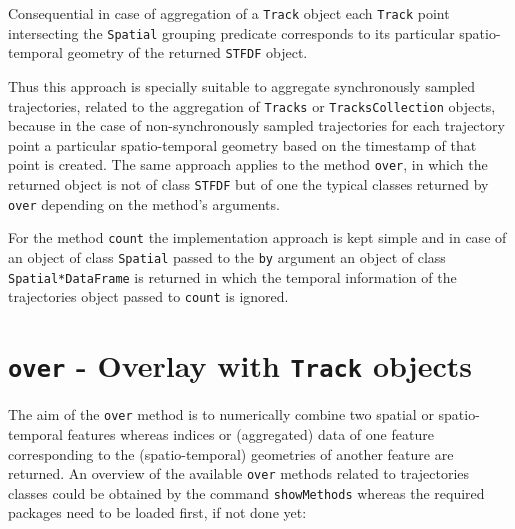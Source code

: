 \documentclass[12pt, oneside, a4paper]{scrbook}
\newcommand{\pkg}[1]{{\normalfont\fontseries{b}\selectfont #1}}
\let\code=\texttt
\newcommand{\codeintitles}[1]{{\tt #1}} %
\begin{document}
Consequential in case of aggregation of a \code{Track} object each \code{Track} point intersecting the \code{Spatial} grouping predicate corresponds to its particular spatio-temporal geometry of the returned \code{STFDF} object. 
\par\medskip
Thus this approach is specially suitable to aggregate synchronously sampled trajectories, related to the aggregation of \code{Tracks} or \code{TracksCollection} objects, because in the case of non-synchronously sampled trajectories for each trajectory point a particular spatio-temporal geometry based on the timestamp of that point is created.
The same approach applies to the method \code{over}, in which the returned object is not of class \code{STFDF} but of one the typical classes returned by \code{over} depending on the method's arguments.
\par\medskip
For the method \code{count} the implementation approach is kept simple and in case of an object of class \code{Spatial} passed to the \code{by} argument an object of class \code{Spatial*DataFrame} is returned in which the temporal information of the \pkg{trajectories} object passed to \code{count} is ignored.
\par\medskip



\section{\codeintitles{over} - Overlay with \codeintitles{Track} objects}
\label{sec:overlaywithtrackobjects}

The aim of the \code{over} method is to numerically combine two spatial or spatio-temporal features whereas indices or (aggregated) data of one feature corresponding to the (spatio-temporal) geometries of another feature are returned.
An overview of the available \code{over} methods related to \pkg{trajectories} classes could be obtained by the command \code{showMethods} whereas the required packages need to be loaded first, if not done yet:
\par\medskip
\end{document}
